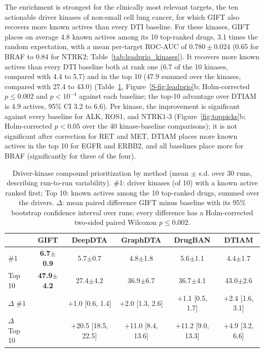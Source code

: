 \documentclass[10pt,letterpaper]{article}
\begin{document}
The enrichment is strongest for the clinically most relevant targets, the ten actionable driver kinases of non-small cell lung cancer, for which GIFT also recovers more known actives than every DTI baseline. For these kinases, GIFT places on average 4.8 known actives among its 10 top-ranked drugs, 3.1 times the random expectation, with a mean per-target ROC-AUC of $0.780\pm0.024$ (0.65 for BRAF to 0.84 for NTRK2; Table~\ref{tab:leadprio_kinases}). It recovers more known actives than every DTI baseline both at rank one (6.7 of the 10 kinases, compared with 4.4 to 5.7) and in the top 10 (47.9 summed over the kinases, compared with 27.4 to 43.0) (Table~\ref{tab:leadprio_baselines}, Figure~\ref{S-fig:leadprio}b; Holm-corrected $p\leq0.002$ and $p<10^{-4}$ against each baseline; the top-10 advantage over DTIAM is 4.9 actives, 95\% CI 3.2 to 6.6). Per kinase, the improvement is significant against every baseline for ALK, ROS1, and NTRK1-3 (Figure~\ref{fig:toppicks}b; Holm-corrected $p<0.05$ over the 40 kinase-baseline comparisons); it is not significant after correction for RET and MET, DTIAM places more known actives in the top 10 for EGFR and ERBB2, and all baselines place more for BRAF (significantly for three of the four).
\begin{table}[t]
\centering
\caption{Driver-kinase compound prioritization by method (mean $\pm$ s.d. over 30 runs, describing run-to-run variability). \#1: driver kinases (of 10) with a known active ranked first; Top 10: known actives among the 10 top-ranked drugs, summed over the drivers. $\Delta$: mean paired difference GIFT minus baseline with its 95\% bootstrap confidence interval over runs; every difference has a Holm-corrected two-sided paired Wilcoxon $p\leq0.002$.}
\label{tab:leadprio_baselines}
\footnotesize
\setlength{\tabcolsep}{4pt}
\begin{tabular}{l c c c c c}
\toprule
 & \textbf{GIFT} & \textbf{DeepDTA} & \textbf{GraphDTA} & \textbf{DrugBAN} & \textbf{DTIAM} \\
\midrule
\#1 & \textbf{6.7$\pm$0.9} & 5.7$\pm$0.7 & 4.8$\pm$1.8 & 5.6$\pm$1.1 & 4.4$\pm$1.7 \\
Top 10 & \textbf{47.9$\pm$4.2} & 27.4$\pm$4.2 & 36.9$\pm$6.7 & 36.7$\pm$4.1 & 43.0$\pm$2.6 \\
\midrule
$\Delta$ \#1 & & $+$1.0 [0.6, 1.4] & $+$2.0 [1.3, 2.6] & $+$1.1 [0.5, 1.7] & $+$2.4 [1.6, 3.1] \\
$\Delta$ Top 10 & & $+$20.5 [18.5, 22.5] & $+$11.0 [8.4, 13.6] & $+$11.2 [9.0, 13.3] & $+$4.9 [3.2, 6.6] \\
\bottomrule
\end{tabular}
\end{table}
\end{document}
